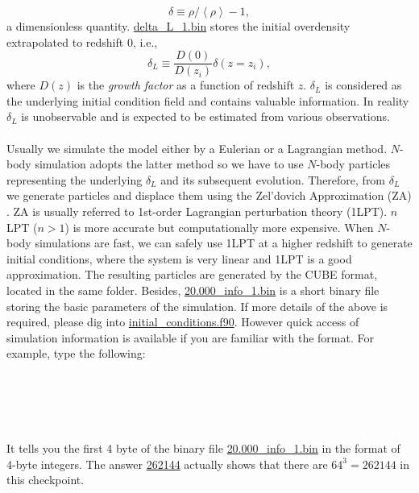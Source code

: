 \documentclass[12pt]{article}
\begin{document}
\begin{equation}
	\delta\equiv\rho/\left\langle\rho\right\rangle-1,
\end{equation}
a dimensionless quantity. \url{delta_L_1.bin} stores the initial overdensity extrapolated to redshift 0, i.e.,
\begin{equation}
	\delta_L\equiv \frac{D(0)}{D(z_i)} \delta(z=z_i),
\end{equation}
where $D(z)$ is the {\it growth factor} as a function of redshift $z$. $\delta_L$ is considered as the underlying initial condition field and contains valuable information. In reality $\delta_L$ is unobservable and is expected to be estimated from various observations.
\\\\
Usually we simulate the model either by a Eulerian or a Lagrangian method. $N$-body simulation adopts the latter method so we have to use $N$-body particles representing the underlying $\delta_L$ and its subsequent evolution. Therefore, from $\delta_L$ we generate particles and displace them using the Zel'dovich Approximation (ZA) \cite{1970A&A.....5...84Z}. ZA is usually referred to 1st-order Lagrangian perturbation theory (1LPT). $n$LPT ($n>1$) is more accurate but computationally more expensive. When $N$-body simulations are fast, we can safely use 1LPT at a higher redshift to generate initial conditions, where the system is very linear and 1LPT is a good approximation. The resulting particles are generated by the CUBE format, located in the same folder. Besides, \url{20.000_info_1.bin} is a short binary file storing the basic parameters of the simulation. If more details of the above is required, please dig into \url{initial_conditions.f90}. However quick access of simulation information is available if you are familiar with the format. For example, type the following:
\\\\
\\
\\
\\
\\
It tells you the first 4 byte of the binary file \url{20.000_info_1.bin} in the format of 4-byte integers. The answer \url{262144} actually shows that there are $64^3=262144$ in this checkpoint.
\end{document}
